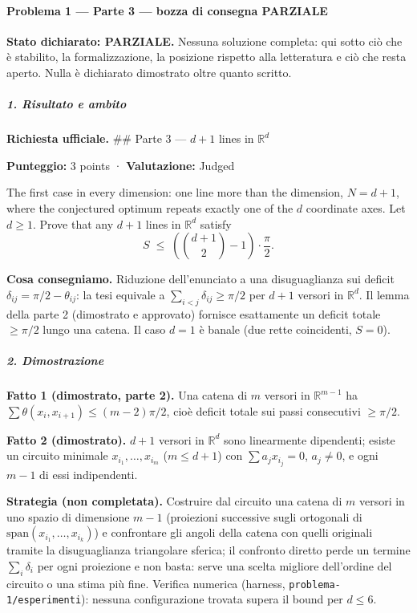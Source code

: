 \documentclass[11pt,a4paper]{article}
\begin{document}
\paragraph{Problema 1 --- Parte 3 --- bozza di consegna
PARZIALE}\label{problema-1-parte-3-bozza-di-consegna-parziale}

\textbf{Stato dichiarato: PARZIALE.} Nessuna soluzione completa: qui
sotto ciò che è stabilito, la formalizzazione, la posizione rispetto
alla letteratura e ciò che resta aperto. Nulla è dichiarato dimostrato
oltre quanto scritto.

\subparagraph{1. Risultato e ambito}\label{risultato-e-ambito}

\textbf{Richiesta ufficiale.} \#\# Parte 3 --- \(d+1\) lines in
\(\mathbb{R}^d\)

\textbf{Punteggio:} 3 points · \textbf{Valutazione:} Judged

The first case in every dimension: one line more than the dimension,
\(N = d+1\), where the conjectured optimum repeats exactly one of the
\(d\) coordinate axes. Let \(d \ge 1\). Prove that any \(d+1\) lines in
\(\mathbb{R}^d\) satisfy \[
S \;\le\; \left( \binom{d+1}{2} - 1 \right) \cdot \frac{\pi}{2}.
\]

\textbf{Cosa consegniamo.} Riduzione dell'enunciato a una disuguaglianza
sui deficit \(\delta_{ij}=\pi/2-\theta_{ij}\): la tesi equivale a
\(\sum_{i<j}\delta_{ij}\ge\pi/2\) per \(d+1\) versori in
\(\mathbb R^d\). Il lemma della parte 2 (dimostrato e approvato)
fornisce esattamente un deficit totale \(\ge\pi/2\) lungo una catena. Il
caso \(d=1\) è banale (due rette coincidenti, \(S=0\)).

\subparagraph{2. Dimostrazione}\label{dimostrazione}

\textbf{Fatto 1 (dimostrato, parte 2).} Una catena di \(m\) versori in
\(\mathbb R^{m-1}\) ha \(\sum\theta(x_i,x_{i+1})\le(m-2)\pi/2\), cioè
deficit totale sui passi consecutivi \(\ge\pi/2\).

\textbf{Fatto 2 (dimostrato).} \(d+1\) versori in \(\mathbb R^d\) sono
linearmente dipendenti; esiste un circuito minimale
\(x_{i_1},\dots,x_{i_m}\) (\(m\le d+1\)) con \(\sum a_j x_{i_j}=0\),
\(a_j\ne0\), e ogni \(m-1\) di essi indipendenti.

\textbf{Strategia (non completata).} Costruire dal circuito una catena
di \(m\) versori in uno spazio di dimensione \(m-1\) (proiezioni
successive sugli ortogonali di \(\mathrm{span}(x_{i_1},\dots,x_{i_k})\))
e confrontare gli angoli della catena con quelli originali tramite la
disuguaglianza triangolare sferica; il confronto diretto perde un
termine \(\sum_i\delta_i\) per ogni proiezione e non basta: serve una
scelta migliore dell'ordine del circuito o una stima più fine. Verifica
numerica (harness, \texttt{problema-1/esperimenti}): nessuna
configurazione trovata supera il bound per \(d\le6\).
\end{document}
